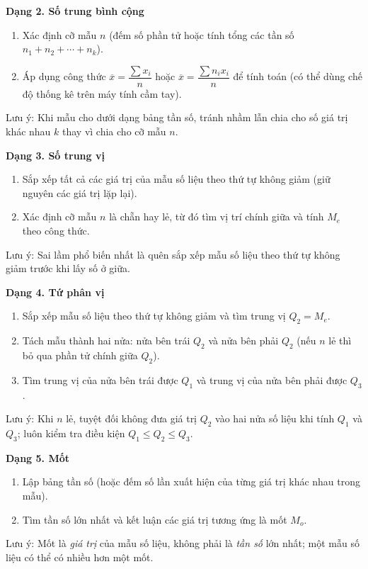 \textbf{Dạng 2. Số trung bình cộng}
\begin{enumerate}
\item Xác định cỡ mẫu $n$ (đếm số phần tử hoặc tính tổng các tần số $n_1 + n_2 + \cdots + n_k$).
\item Áp dụng công thức $\overline{x} = \dfrac{\sum x_i}{n}$ hoặc $\overline{x} = \dfrac{\sum n_i x_i}{n}$ để tính toán (có thể dùng chế độ thống kê trên máy tính cầm tay).
\end{enumerate}
Lưu ý: Khi mẫu cho dưới dạng bảng tần số, tránh nhầm lẫn chia cho số giá trị khác nhau $k$ thay vì chia cho cỡ mẫu $n$.

\textbf{Dạng 3. Số trung vị}
\begin{enumerate}
\item Sắp xếp tất cả các giá trị của mẫu số liệu theo thứ tự không giảm (giữ nguyên các giá trị lặp lại).
\item Xác định cỡ mẫu $n$ là chẵn hay lẻ, từ đó tìm vị trí chính giữa và tính $M_e$ theo công thức.
\end{enumerate}
Lưu ý: Sai lầm phổ biến nhất là quên sắp xếp mẫu số liệu theo thứ tự không giảm trước khi lấy số ở giữa.

\textbf{Dạng 4. Tứ phân vị}
\begin{enumerate}
\item Sắp xếp mẫu số liệu theo thứ tự không giảm và tìm trung vị $Q_2 = M_e$.
\item Tách mẫu thành hai nửa: nửa bên trái $Q_2$ và nửa bên phải $Q_2$ (nếu $n$ lẻ thì bỏ qua phần tử chính giữa $Q_2$).
\item Tìm trung vị của nửa bên trái được $Q_1$ và trung vị của nửa bên phải được $Q_3$.
\end{enumerate}
Lưu ý: Khi $n$ lẻ, tuyệt đối không đưa giá trị $Q_2$ vào hai nửa số liệu khi tính $Q_1$ và $Q_3$; luôn kiểm tra điều kiện $Q_1 \le Q_2 \le Q_3$.

\textbf{Dạng 5. Mốt}
\begin{enumerate}
\item Lập bảng tần số (hoặc đếm số lần xuất hiện của từng giá trị khác nhau trong mẫu).
\item Tìm tần số lớn nhất và kết luận các giá trị tương ứng là mốt $M_o$.
\end{enumerate}
Lưu ý: Mốt là \textit{giá trị} của mẫu số liệu, không phải là \textit{tần số} lớn nhất; một mẫu số liệu có thể có nhiều hơn một mốt.
